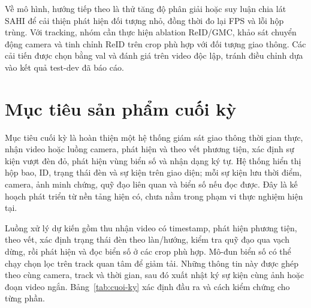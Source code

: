 \documentclass[fontsize=13pt,a4paper,oneside,parskip=false,numbers=noenddot,bibliography=totoc]{scrreprt}
\begin{document}
Về mô hình, hướng tiếp theo là thử tăng độ phân giải hoặc suy luận chia lát SAHI \cite{akyon2022sahi} để cải thiện phát hiện đối tượng nhỏ, đồng thời đo lại FPS và lỗi hộp trùng. Với tracking, nhóm cần thực hiện ablation ReID/GMC, khảo sát chuyển động camera và tinh chỉnh ReID trên crop phù hợp với đối tượng giao thông. Các cải tiến được chọn bằng val và đánh giá trên video độc lập, tránh điều chỉnh dựa vào kết quả test-dev đã báo cáo.

\section*{Mục tiêu sản phẩm cuối kỳ}
\label{sec:cuoi-ky}
Mục tiêu cuối kỳ là hoàn thiện một hệ thống giám sát giao thông thời gian thực, nhận video hoặc luồng camera, phát hiện và theo vết phương tiện, xác định sự kiện vượt đèn đỏ, phát hiện vùng biển số và nhận dạng ký tự. Hệ thống hiển thị hộp bao, ID, trạng thái đèn và sự kiện trên giao diện; mỗi sự kiện lưu thời điểm, camera, ảnh minh chứng, quỹ đạo liên quan và biển số nếu đọc được. Đây là kế hoạch phát triển từ nền tảng hiện có, chưa nằm trong phạm vi thực nghiệm hiện tại.

Luồng xử lý dự kiến gồm thu nhận video có timestamp, phát hiện phương tiện, theo vết, xác định trạng thái đèn theo làn/hướng, kiểm tra quỹ đạo qua vạch dừng, rồi phát hiện và đọc biển số ở các crop phù hợp. Mô-đun biển số có thể chạy chọn lọc trên track quan tâm để giảm tải. Những thông tin này được ghép theo cùng camera, track và thời gian, sau đó xuất nhật ký sự kiện cùng ảnh hoặc đoạn video ngắn. Bảng~\ref{tab:cuoi-ky} xác định đầu ra và cách kiểm chứng cho từng phần.
\end{document}
